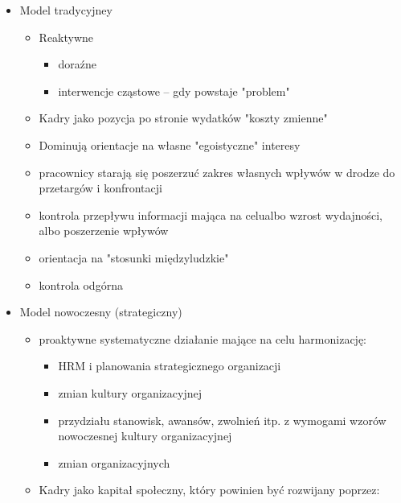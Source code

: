 \documentclass[a4paper,10pt]{report}
\begin{document}
\begin{itemize}
	\item Model tradycyjney
	\begin{itemize}
		\item Reaktywne
		\begin{itemize}
			\item doraźne
			\item interwencje cząstowe -- gdy powstaje "problem"
		\end{itemize}
		\item Kadry jako pozycja po stronie wydatków "koszty zmienne"
		\item Dominują orientacje na własne "egoistyczne" interesy
		\item pracownicy starają się poszerzuć zakres własnych wpływów w drodze do przetargów i konfrontacji
		\item kontrola przepływu informacji mająca na celualbo wzrost wydajności, albo poszerzenie wpływów
		\item orientacja na "stosunki międzyludzkie"
		\item kontrola odgórna
	\end{itemize}
	\item Model nowoczesny (strategiczny)
	\begin{itemize}
		\item proaktywne systematyczne działanie mające na celu harmonizację:
		\begin{itemize}
			\item HRM i planowania strategicznego organizacji
			\item zmian kultury organizacyjnej
			\item przydziału stanowisk, awansów, zwolnień itp. z wymogami wzorów nowoczesnej kultury organizacyjnej
			\item zmian organizacyjnych
		\end{itemize}
		\item Kadry jako kapitał społeczny, który powinien być rozwijany poprzez:
		

\end{itemize}
\end{itemize}
\end{document}
